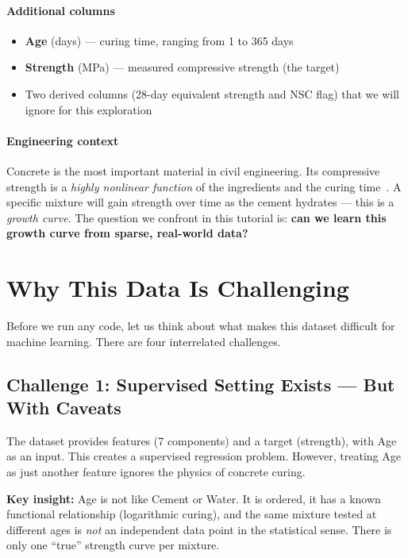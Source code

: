 \documentclass[11pt]{article}
\begin{document}
\paragraph{Additional columns}
\begin{itemize}[nosep]
  \item \textbf{Age} (days) --- curing time, ranging from 1 to 365 days
  \item \textbf{Strength} (MPa) --- measured compressive strength (the target)
  \item Two derived columns (28-day equivalent strength and NSC flag) that we will ignore for this exploration
\end{itemize}

\paragraph{Engineering context}
Concrete is the most important material in civil engineering.  Its compressive strength is a \emph{highly nonlinear function} of the ingredients and the curing time~\cite{yeh1998}.  A specific mixture will gain strength over time as the cement hydrates --- this is a \emph{growth curve}.  The question we confront in this tutorial is: \textbf{can we learn this growth curve from sparse, real-world data?}

\section{Why This Data Is Challenging}
\label{sec:challenges}

Before we run any code, let us think about what makes this dataset difficult for machine learning.  There are four interrelated challenges.

\subsection{Challenge 1: Supervised Setting Exists --- But With Caveats}

The dataset provides features (7 components) and a target (strength), with Age as an input.  This creates a supervised regression problem.  However, treating Age as just another feature ignores the physics of concrete curing.

\begin{alert-box}
\textbf{Key insight:} Age is not like Cement or Water.  It is ordered, it has a known functional relationship (logarithmic curing), and the same mixture tested at different ages is \emph{not} an independent data point in the statistical sense.  There is only one ``true'' strength curve per mixture.
\end{alert-box}
\end{document}
